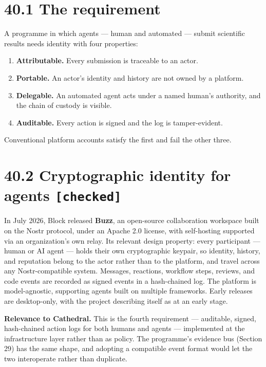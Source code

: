 \documentclass[
  11pt]{report}
\providecommand{\tightlist}{%
  \setlength{\itemsep}{0pt}\setlength{\parskip}{0pt}}
\begin{document}
\hypertarget{the-requirement}{%
\section{40.1 The requirement}\label{the-requirement}}

A programme in which agents --- human and automated --- submit
scientific results needs identity with four properties:

\begin{enumerate}
\def\labelenumi{\arabic{enumi}.}
\tightlist
\item
  \textbf{Attributable.} Every submission is traceable to an actor.
\item
  \textbf{Portable.} An actor's identity and history are not owned by a
  platform.
\item
  \textbf{Delegable.} An automated agent acts under a named human's
  authority, and the chain of custody is visible.
\item
  \textbf{Auditable.} Every action is signed and the log is
  tamper-evident.
\end{enumerate}

Conventional platform accounts satisfy the first and fail the other
three.

\hypertarget{cryptographic-identity-for-agents-checked}{%
\section{\texorpdfstring{40.2 Cryptographic identity for agents
\texttt{{[}checked{]}}}{40.2 Cryptographic identity for agents {[}checked{]}}}\label{cryptographic-identity-for-agents-checked}}

In July 2026, Block released \textbf{Buzz}, an open-source collaboration
workspace built on the Nostr protocol, under an Apache 2.0 license, with
self-hosting supported via an organization's own relay. Its relevant
design property: every participant --- human or AI agent --- holds their
own cryptographic keypair, so identity, history, and reputation belong
to the actor rather than to the platform, and travel across any
Nostr-compatible system. Messages, reactions, workflow steps, reviews,
and code events are recorded as signed events in a hash-chained log. The
platform is model-agnostic, supporting agents built on multiple
frameworks. Early releases are desktop-only, with the project describing
itself as at an early stage.

\textbf{Relevance to Cathedral.} This is the fourth requirement ---
auditable, signed, hash-chained action logs for both humans and agents
--- implemented at the infrastructure layer rather than as policy. The
programme's evidence bus (Section 29) has the same shape, and adopting a
compatible event format would let the two interoperate rather than
duplicate.
\end{document}
